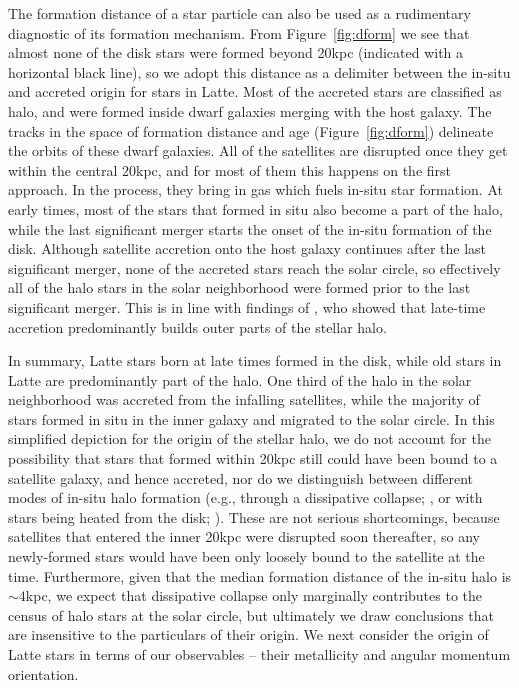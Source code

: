 \documentclass[apj, twocolappendix, numberedappendix, appendixfloats]{emulateapj}
\begin{document}
The formation distance of a star particle can also be used as a rudimentary diagnostic of its formation mechanism.
From Figure~\ref{fig:dform} we see that almost none of the disk stars were formed beyond 20\;kpc (indicated with a horizontal black line), so we adopt this distance as a delimiter between the in-situ and accreted origin for stars in Latte.
Most of the accreted stars are classified as halo, and were formed inside dwarf galaxies merging with the host galaxy.
The tracks in the space of formation distance and age (Figure~\ref{fig:dform}) delineate the orbits of these dwarf galaxies.
All of the satellites are disrupted once they get within the central 20\;kpc, and for most of them this happens on the first approach.
In the process, they bring in gas which fuels in-situ star formation.
At early times, most of the stars that formed in situ also become a part of the halo, while the last significant merger starts the onset of the in-situ formation of the disk.
Although satellite accretion onto the host galaxy continues after the last significant merger, none of the accreted stars reach the solar circle, so effectively all of the halo stars in the solar neighborhood were formed prior to the last significant merger.
This is in line with findings of \citet{zolotov2009}, who showed that late-time accretion predominantly builds outer parts of the stellar halo.

In summary, Latte stars born at late times formed in the disk, while old stars in Latte are predominantly part of the halo.
One third of the halo in the solar neighborhood was accreted from the infalling satellites, while the majority of stars formed in situ in the inner galaxy and migrated to the solar circle.
In this simplified depiction for the origin of the stellar halo, we do not account for the possibility that stars that formed within 20\;kpc still could have been bound to a satellite galaxy, and hence accreted, nor do we distinguish between different modes of in-situ halo formation (e.g., through a dissipative collapse; \citealt{samland2003}, or with stars being heated from the disk; \citealt{purcell2010}).
These are not serious shortcomings, because satellites that entered the inner 20\;kpc were disrupted soon thereafter, so any newly-formed stars would have been only loosely bound to the satellite at the time.
Furthermore, given that the median formation distance of the in-situ halo is $\sim4$\;kpc, we expect that dissipative collapse only marginally contributes to the census of halo stars at the solar circle, but ultimately we draw conclusions that are insensitive to the particulars of their origin.
We next consider the origin of Latte stars in terms of our observables -- their metallicity and angular momentum orientation.
\end{document}
